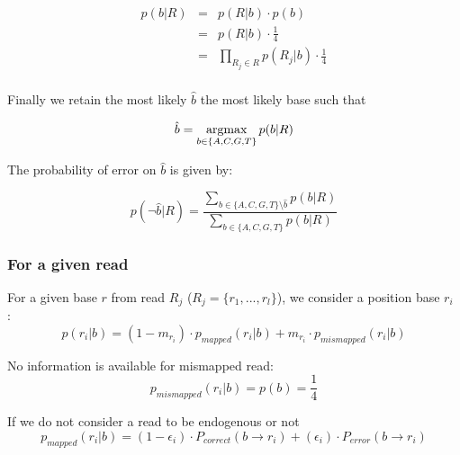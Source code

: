 \documentclass[a4paper,12pt]{article}
\newcommand{\argmax}{\operatornamewithlimits{argmax}}
\begin{document}
\begin{eqnarray}
  p(b|R)   & = & p(R|b) \cdot p(b)  \\
           & = & p(R|b) \cdot \frac {1} {4} \\
           & = & \prod_{R_j \in R} p(R_j|b) \cdot \frac {1} {4} \\
\end{eqnarray} 



\noindent  Finally we retain the most likely $\hat{b}$ the most likely base such that 

\begin{equation}
\hat{b} = \argmax_{b \in \{A,C,G,T\} }   p(b|R)
\end{equation} 


\noindent  The probability of error on $\hat{b}$ is given by:

\begin{equation}
p(\neg \hat{b}|R) = \frac { \sum\limits_{ b \in \{A,C,G,T\}  \setminus \hat{b} } p(b|R) } { \sum\limits_{ b \in \{A,C,G,T\}  } p(b|R) }
\label{errormt}
\end{equation}
 


\subsubsection{For a given read}
\noindent For a given base $r$ from read $R_j$  ($R_j = \{ r_1, ..., r_l \}$), we consider a position base $r_{i}$ :
\begin{equation}
  p(r_i|b)   =  (1-m_{r_i}) \cdot p_{mapped}(r_i|b) + m_{r_i} \cdot p_{mismapped}(r_i|b) 
\end{equation} 


\noindent No information is available for mismapped read:
\begin{equation}
  p_{mismapped}(r_i|b)   =  p(b) =     \frac{ 1} {4} 
\end{equation} 



\noindent If we do not consider a read to be endogenous or not
\begin{equation}
  p_{mapped}(r_i|b)   =  (1-\epsilon_i ) \cdot  P_{correct}( b \to r_i) +  (\epsilon_i) \cdot P_{error}(  b \to r_i )   
\end{equation} 
\end{document}
